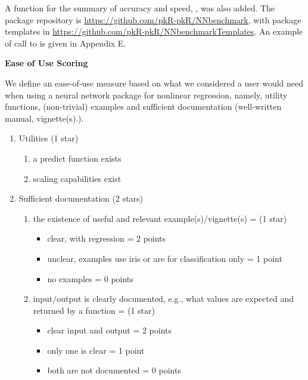 A function for the summary of accuracy and speed, , was
also added. The package repository is
\url{https://github.com/pkR-pkR/NNbenchmark}, with package templates in
\url{https://github.com/pkR-pkR/NNbenchmarkTemplates}. An example of
call to  is given in Appendix E.

\textbf{Ease of Use Scoring}

We define an ease-of-use measure based on what we considered a user
would need when using a neural network package for nonlinear regression,
namely, utility functions, (non-trivial) examples and sufficient
documentation (well-written manual, vignette(s).).

\begin{enumerate}
\def\labelenumi{\arabic{enumi}.}
\tightlist
\item
  Utilities (1 star)

  \begin{enumerate}
  \def\labelenumii{\alph{enumii}.}
  \tightlist
  \item
    a predict function exists
  \item
    scaling capabilities exist
  \end{enumerate}
\item
  Sufficient documentation (2 stars)

  \begin{enumerate}
  \def\labelenumii{\alph{enumii}.}
  \tightlist
  \item
    the existence of useful and relevant example(s)/vignette(s) = (1
    star)

    \begin{itemize}
    \tightlist
    \item
      clear, with regression = 2 points
    \item
      unclear, examples use iris or are for classification only = 1
      point
    \item
      no examples = 0 points
    \end{itemize}
  \item
    input/output is clearly documented, e.g., what values are expected
    and returned by a function = (1 star)

    \begin{itemize}
    \tightlist
    \item
      clear input and output = 2 points
    \item
      only one is clear = 1 point
    \item
      both are not documented = 0 points
    \end{itemize}
  \end{enumerate}
\end{enumerate}

